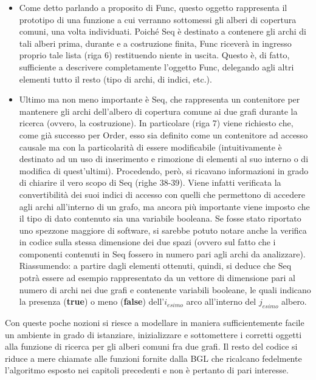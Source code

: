 \begin{itemize}
 \item Come detto parlando a proposito di Func, questo oggetto rappresenta il prototipo di una funzione a cui verranno sottomessi gli alberi di copertura comuni, una volta individuati. Poiché Seq è destinato a contenere gli archi di tali alberi prima, durante e a costruzione finita, Func riceverà in ingresso proprio tale lista (riga 6) restituendo niente in uscita. Questo è, di fatto, sufficiente a descrivere completamente l'oggetto Func, delegando agli altri elementi tutto il resto (tipo di archi, di indici, etc.).
 \item Ultimo ma non meno importante è Seq, che rappresenta un contenitore per mantenere gli archi dell'albero di copertura comune ai due grafi durante la ricerca (ovvero, la costruzione). In particolare (riga 7) viene richiesto che, come già successo per Order, esso sia definito come un contenitore ad accesso causale ma con la particolarità di essere modificabile (intuitivamente è destinato ad un uso di inserimento e rimozione di elementi al suo interno o di modifica di quest'ultimi). Procedendo, però, si ricavano informazioni in grado di chiarire il vero scopo di Seq (righe 38-39). Viene infatti verificata la convertibilità dei suoi indici di accesso con quelli che permettono di accedere agli archi all'interno di un grafo, ma ancora più importante viene imposto che il tipo di dato contenuto sia una variabile booleana. Se fosse stato riportato uno spezzone maggiore di software, si sarebbe potuto notare anche la verifica in codice sulla stessa dimensione dei due spazi (ovvero sul fatto che i componenti contenuti in Seq fossero in numero pari agli archi da analizzare). Riassumendo: a partire dagli elementi ottenuti, quindi, si deduce che Seq potrà essere ad esempio rappresentato da un vettore di dimensione pari al numero di archi nei due grafi e contenente variabili booleane, le quali indicano la presenza (\textbf{true}) o meno (\textbf{false}) dell'$i_{esimo}$ arco all'interno del $j_{esimo}$ albero.
\end{itemize}

Con queste poche nozioni si riesce a modellare in maniera sufficientemente facile un ambiente in grado di istanziare, inizializzare e sottomettere i corretti oggetti alla funzione di ricerca per gli alberi comuni fra due grafi. Il resto del codice si riduce a mere chiamate alle funzioni fornite dalla BGL che ricalcano fedelmente l'algoritmo esposto nei capitoli precedenti e non è pertanto di pari interesse.

\paragraph{}

